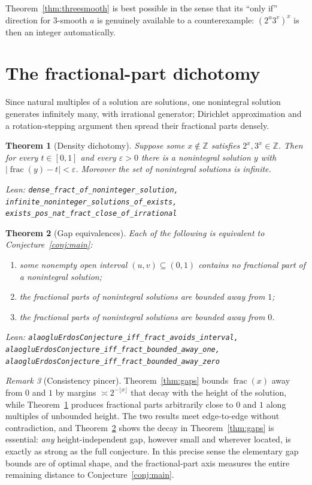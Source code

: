 \documentclass[11pt]{article}
\newtheorem{theorem}{Theorem}[section]
\theoremstyle{definition}
\theoremstyle{remark}
\newtheorem{remark}[theorem]{Remark}
\newcommand{\Z}{\mathbb{Z}}
\newcommand{\lean}[1]{\par\smallskip\noindent\begingroup\footnotesize\raggedright\emph{Lean:} \texttt{#1}\par\endgroup}
\newcommand{\fract}{\operatorname{frac}}
\begin{document}
Theorem~\ref{thm:threesmooth} is best possible in the sense that its ``only if'' direction
for $3$-smooth $a$ is genuinely available to a counterexample: $(2^u3^v)^x$ is then an
integer automatically.

\section{The fractional-part dichotomy}\label{sec:dichotomy}

Since natural multiples of a solution are solutions, one nonintegral solution generates
infinitely many, with irrational generator; Dirichlet approximation and a rotation-stepping
argument then spread their fractional parts densely.

\begin{theorem}[Density dichotomy]\label{thm:dichotomy}
Suppose some $x\notin\Z$ satisfies $2^x,3^x\in\Z$. Then for every $t\in[0,1]$ and every
$\varepsilon>0$ there is a nonintegral solution $y$ with
$|\fract(y)-t|<\varepsilon$. Moreover the set of nonintegral solutions is infinite.
\lean{dense\_fract\_of\_noninteger\_solution,
infinite\_noninteger\_solutions\_of\_exists,
exists\_pos\_nat\_fract\_close\_of\_irrational}
\end{theorem}

\begin{theorem}[Gap equivalences]\label{thm:equiv}
Each of the following is equivalent to Conjecture~\ref{conj:main}:
\begin{enumerate}
\item some nonempty open interval $(u,v)\subseteq(0,1)$ contains no fractional part of a
nonintegral solution;
\item the fractional parts of nonintegral solutions are bounded away from $1$;
\item the fractional parts of nonintegral solutions are bounded away from $0$.
\end{enumerate}
\lean{alaogluErdosConjecture\_iff\_fract\_avoids\_interval,
alaogluErdosConjecture\_iff\_fract\_bounded\_away\_one,
alaogluErdosConjecture\_iff\_fract\_bounded\_away\_zero}
\end{theorem}

\begin{remark}[Consistency pincer]\label{rem:pincer}
Theorem~\ref{thm:gaps} bounds $\fract(x)$ away from $0$ and $1$ by margins
$\asymp 2^{-\lfloor x\rfloor}$ that decay with the height of the solution, while
Theorem~\ref{thm:dichotomy} produces fractional parts arbitrarily close to $0$ and $1$
along multiples of unbounded height. The two results meet edge-to-edge without
contradiction, and Theorem~\ref{thm:equiv} shows the decay in Theorem~\ref{thm:gaps} is
essential: \emph{any} height-independent gap, however small and wherever located, is
exactly as strong as the full conjecture. In this precise sense the elementary gap bounds
are of optimal shape, and the fractional-part axis measures the entire remaining distance
to Conjecture~\ref{conj:main}.
\end{remark}
\end{document}
